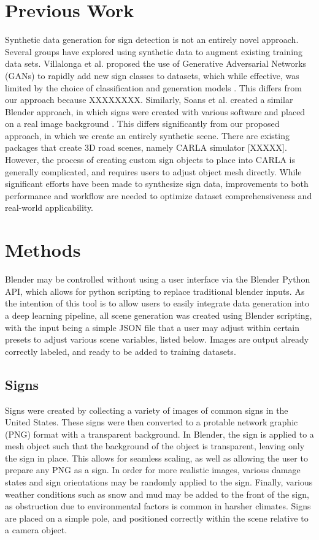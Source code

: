 \documentclass[journal]{IEEEtran}
\begin{document}
\section{Previous Work}

 Synthetic data generation for sign detection is not an entirely novel approach. Several groups have explored using synthetic data to augment existing training data sets. Villalonga et al. proposed the use of Generative Adversarial Networks (GANs) to rapidly add new sign classes to datasets, which while effective, was limited by the choice of classification and generation models \cite{GAN_artificial_data}. This differs from our approach because XXXXXXXX. Similarly, Soans et al. created a similar Blender approach, in which signs were created with various software and placed on a real image background \cite{blender_paper}. This differs significantly from our proposed approach, in which we create an entirely synthetic scene. There are existing packages that create 3D road scenes, namely CARLA simulator [XXXXX]. However, the process of creating custom sign objects to place into CARLA is generally complicated, and requires users to adjust object mesh directly. While significant efforts have been made to synthesize sign data, improvements to both performance and workflow are needed to optimize dataset comprehensiveness and real-world applicability. 
\section{Methods}
Blender may be controlled without using a user interface via the Blender Python API, which allows for python scripting to replace traditional blender inputs. As the intention of this tool is to allow users to easily integrate data generation into a deep learning pipeline, all scene generation was created using Blender scripting, with the input being a simple JSON file that a user may adjust within certain presets to adjust various scene variables, listed below. Images are output already correctly labeled, and ready to be added to training datasets. 
\subsection{Signs}
Signs were created by collecting a variety of images of common signs in the United States. These signs were then converted to a protable network graphic (PNG) format with a transparent background. In Blender, the sign is applied to a mesh object such that the background of the object is transparent, leaving only the sign in place. This allows for seamless scaling, as well as allowing the user to prepare any PNG as a sign. In order for more realistic images, various damage states and sign orientations may be randomly applied to the sign. Finally, various weather conditions such as snow and mud may be added to the front of the sign, as obstruction due to environmental factors is common in harsher climates. Signs are placed on a simple pole, and positioned correctly within the scene relative to a camera object. 
\end{document}
